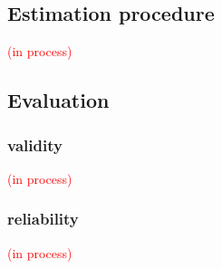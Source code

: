 \subsection{Estimation procedure} \label{s_sect:estimation}
%
\textcolor{red}{(in process)}

\begin{comment}
We are going to work under the Bayesian framework, for details see latex code and variables to consider files. 

Identification of model:  
soft identification (see \citet{Depaoli_2021}) 

justification 
the benefits, and a comparison with the other options under the frequentist framework in \citet{Verhavert_2018}.
 
benefits:  
see master thesis, and \citet{Verhavert_2018} (p. 42-43) 


where \citep{Stan_2020} 
\end{comment}
%
%
\subsection{Evaluation}
%
\subsubsection{validity}
%
\textcolor{red}{(in process)}

\begin{comment}
correlate latent scores (from different methods) with entropy measures (see research proposal)

\textbf{critique:} What about decision statements or think at loud rating process? (is it possible), \citet{Lesterhuis_2018} has shown their usefulness, while \citet{Boonen_et_al_2020} signals the need to know about the inner working of judgment processes.
\end{comment}
%
%
\subsubsection{reliability}
%
\textcolor{red}{(in process)}

\begin{comment}
compare the Scale Separation Reliability (SSR, an inter-rater reliability measure), coming from CJ methods, with others for other methods

- No intra-rater reliability, also known as test-retest reliability (Verhavert_2018, Reliability_wiki_2022) 
- No Inter-method reliability,  assesses the degree to which test scores are consistent when there is a variation in the methods or instruments used (Verhavert_2018, Reliability_wiki_2022) 
- No comparison of SSR vs the true correlation of the latent scale and entropy measures 
* Justification: (Verhavert_2018, p. 156) " simulation studies could resolve the inconclusiveness regarding the SSR as a correlation with the truth."
\end{comment}
%
%
